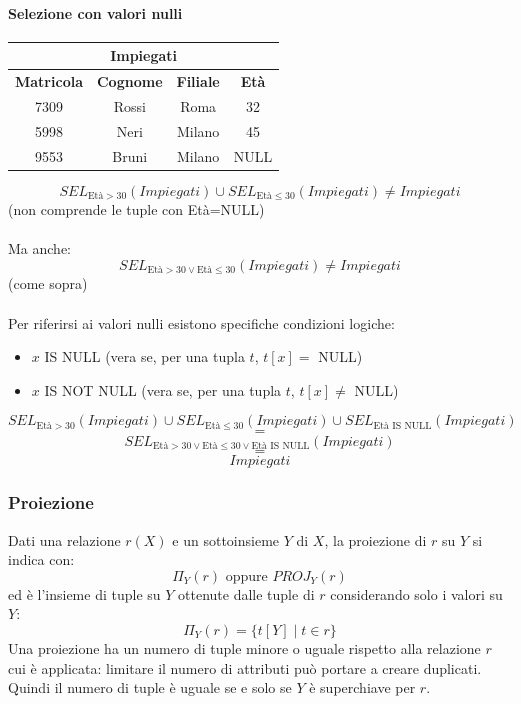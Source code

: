 \documentclass[../main.tex]{subfiles}
\begin{document}
	\paragraph{Selezione con valori nulli}
	\begin{center}
		\begin{tabular}{ |c|c|c|c| }
			\hline
			\multicolumn{4}{|c|}{Impiegati}\\
			\hline
			\textbf{Matricola} & \textbf{Cognome} & \textbf{Filiale} & \textbf{Età}\\
			\hline
			7309 & Rossi & Roma & 32\\
			5998 & Neri & Milano & 45\\
			9553 & Bruni & Milano & NULL\\
			\hline
		\end{tabular}
	\end{center}
	\[SEL_{\text{Età} >30}(Impiegati) \cup SEL_{\text{Età} \leq30}(Impiegati) \neq Impiegati\]
	(non comprende le tuple con Età=NULL)\\\\
	Ma anche:
	\[SEL_{\text{Età}>30 \vee \text{Età}\leq30}(Impiegati) \neq Impiegati\]
	(come sopra)\\\\
	Per riferirsi ai valori nulli esistono specifiche condizioni logiche:
	\begin{itemize}
		\item $x$ IS NULL (vera se, per una tupla $t$, $t[x]=$ NULL)
		\item $x$ IS NOT NULL (vera se, per una tupla $t$, $t[x] \neq$ NULL)
	\end{itemize}
	\[SEL_{\text{Età} > 30} (Impiegati) \cup SEL_{\text{Età} \leq 30} (Impiegati) \cup SEL_{\text{Età IS NULL}} (Impiegati)\]
	\[=\]
	\[SEL_{\text{Età} > 30 \vee \text{Età} \leq 30 \vee \text{Età IS NULL}} (Impiegati)\]
	\[=\]
	\[Impiegati\]
	\subsubsection{Proiezione}
	Dati una relazione $r(X)$ e un sottoinsieme $Y$ di $X$, la proiezione di $r$ su $Y$ si indica con:
	\[\Pi_Y (r) \text{ oppure } PROJ_Y (r)\]
	ed è l’insieme di tuple su $Y$ ottenute dalle tuple di $r$ considerando solo i valori su $Y$:
	\[\Pi_Y (r) = \{ t[Y] \; \vert \; t \in r\}\]
	Una proiezione ha un numero di tuple minore o uguale rispetto alla relazione $r$ cui è applicata: limitare il numero di attributi può portare a creare duplicati. \\
	Quindi il numero di tuple è uguale se e solo se $Y$ è superchiave per $r$.
\end{document}
